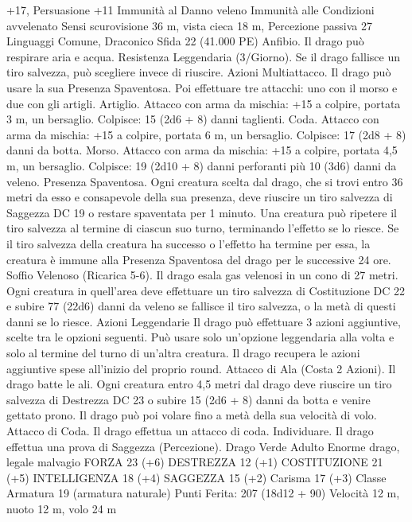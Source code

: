 \begin{multicols}{2}
+17, Persuasione +11
Immunità al Danno veleno
Immunità alle Condizioni avvelenato
Sensi scurovisione 36 m, vista cieca 18 m, Percezione passiva 27
Linguaggi Comune, Draconico
Sfida 22 (41.000 PE)
Anfibio. Il drago può respirare aria e acqua.
Resistenza Leggendaria (3/Giorno). Se il drago fallisce un tiro
salvezza, può scegliere invece di riuscire.
Azioni
Multiattacco. Il drago può usare la sua Presenza Spaventosa. Poi
effettuare tre attacchi: uno con il morso e due con gli artigli.
Artiglio. Attacco con arma da mischia: +15 a colpire, portata 3
m, un bersaglio.
Colpisce: 15 (2d6 + 8) danni taglienti.
Coda. Attacco con arma da mischia: +15 a colpire, portata 6 m,
un bersaglio.
Colpisce: 17 (2d8 + 8) danni da botta.
Morso. Attacco con arma da mischia: +15 a colpire, portata 4,5
m, un bersaglio.
Colpisce: 19 (2d10 + 8) danni perforanti più 10 (3d6) danni da veleno.
Presenza Spaventosa. Ogni creatura scelta dal drago, che si trovi
entro 36 metri da esso e consapevole della sua presenza, deve
riuscire un tiro salvezza di Saggezza DC 19 o restare spaventata per
1 minuto. Una creatura può ripetere il tiro salvezza al termine di
ciascun suo turno, terminando l’effetto se lo riesce. Se il tiro salvezza
della creatura ha successo o l’effetto ha termine per essa, la creatura è
immune alla Presenza Spaventosa del drago per le successive 24 ore.
Soffio Velenoso (Ricarica 5-6). Il drago esala gas velenosi in un
cono di 27 metri. Ogni creatura in quell’area deve effettuare un tiro
salvezza di Costituzione DC 22 e subire 77 (22d6) danni da veleno se
fallisce il tiro salvezza, o la metà di questi danni se lo riesce.
Azioni Leggendarie
Il drago può effettuare 3 azioni aggiuntive, scelte tra le opzioni
seguenti. Può usare solo un’opzione leggendaria alla volta e solo
al termine del turno di un’altra creatura. Il drago recupera le
azioni aggiuntive spese all’inizio del proprio round.
Attacco di Ala (Costa 2 Azioni). Il drago batte le ali. Ogni
creatura entro 4,5 metri dal drago deve riuscire un tiro salvezza
di Destrezza DC 23 o subire 15 (2d6 + 8) danni da botta e
venire gettato prono. Il drago può poi volare fino a metà della
sua velocità di volo.
Attacco di Coda. Il drago effettua un attacco di coda.
Individuare. Il drago effettua una prova di Saggezza
(Percezione).
Drago Verde Adulto
Enorme drago, legale malvagio
FORZA 23 (+6)
DESTREZZA 12 (+1)
COSTITUZIONE 21 (+5)
INTELLIGENZA 18 (+4)
SAGGEZZA 15 (+2)
Carisma 17 (+3)
Classe Armatura 19 (armatura naturale)
\hspace*{0pt}\hfill{Punti Ferita}: 207 (18d12 + 90)
Velocità 12 m, nuoto 12 m, volo 24 m

\end{multicols}
